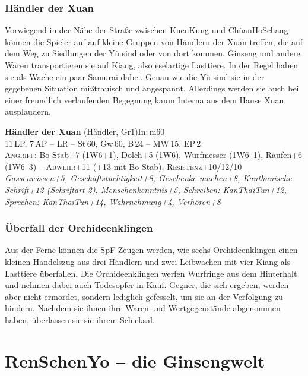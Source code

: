 \documentclass[
a4paper,
twoside,
DIV=calc,
BCOR=4mm,
fontsize=9pt,
twocolumn=on,
titlepage=on,
parskip=half
]{scrartcl}
\begin{document}
\subsubsection{Händler der Xuan}

Vorwiegend in der Nähe der Straße zwischen KuenKung und ChüanHoSchang
können die Spieler auf auf kleine Gruppen von Händlern der Xuan
treffen, die auf dem Weg zu Siedlungen der Yü sind oder von dort
kommen. Ginseng und andere Waren transportieren sie auf Kiang, also
eselartige Lasttiere. In der Regel haben sie als Wache ein paar
Samurai dabei. Genau wie die Yü sind sie in der gegebenen Situation
mißtrauisch und angespannt. Allerdings werden sie auch bei einer
freundlich verlaufenden Begegnung kaum Interna aus dem Hause Xuan
ausplaudern.

\textbf{Händler der Xuan} (Händler, Gr1)\hfill In:\,m60\\
11\,LP, 7\,AP -- LR -- St\,60, Gw\,60, B\,24 -- MW\,15, EP\,2\\
\textsc{Angriff:} Bo-Stab+7 (1W6+1), Dolch+5 (1W6), Wurfmesser
(1W6--1), Raufen+6 (1W6--3) -- \textsc{Abwehr}+11 (+13 mit Bo-Stab),
\textsc{Resistenz}+10/12/10\\
\emph{Gassenwissen+5, Geschäftstüchtigkeit+8, Geschenke machen+8,
  Kanthanische Schrift+12 (Schriftart 2), Menschenkenntnis+5,
  Schreiben: KanThaiTun+12, Sprechen: KanThaiTun+14, Wahrnehmung+4,
  Verhören+8}

\subsubsection{Überfall der Orchideenklingen}

Aus der Ferne können die SpF Zeugen werden, wie sechs Orchideenklingen
einen kleinen Handelszug aus drei Händlern und zwei Leibwachen mit
vier Kiang als Lasttiere überfallen. Die Orchideenklingen werfen
Wurfringe aus dem Hinterhalt und nehmen dabei auch Todesopfer in
Kauf. Gegner, die sich ergeben, werden aber nicht ermordet, sondern
lediglich gefesselt, um sie an der Verfolgung zu hindern. Nachdem sie
ihnen ihre Waren und Wertgegenstände abgenommen haben, überlassen sie
sie ihrem Schicksal.

\section{RenSchenYo -- die Ginsengwelt}
\end{document}
